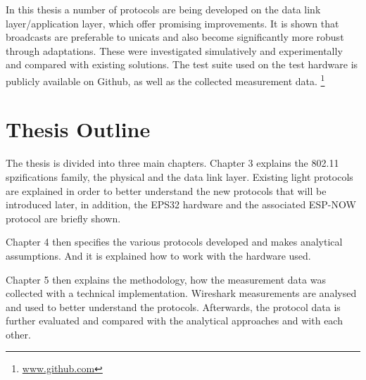 In this thesis a number of protocols are being developed on the data link layer/application layer,
which offer promising improvements.
It is shown that broadcasts are preferable to unicats
and also become significantly more robust through adaptations.
These were investigated simulatively and experimentally and compared with existing solutions.
The test suite used on the test hardware is publicly available on Github,
as well as the collected measurement data.
\footnote{\url{www.github.com}}

\section*{Thesis Outline}

The thesis is divided into three main chapters.
Chapter 3 explains the 802.11 spzifications family, the physical and the data link layer.
Existing light protocols are explained in order to better understand the new protocols that will be introduced later,
in addition, the EPS32 hardware and the associated ESP-NOW protocol are briefly shown.

Chapter 4 then specifies the various protocols developed and makes analytical assumptions.
And it is explained how to work with the hardware used.

Chapter 5 then explains the methodology, how the measurement data was collected with a technical implementation.
Wireshark measurements are analysed and used to better understand the protocols.
Afterwards, the protocol data is further evaluated and compared with the analytical approaches and with each other.